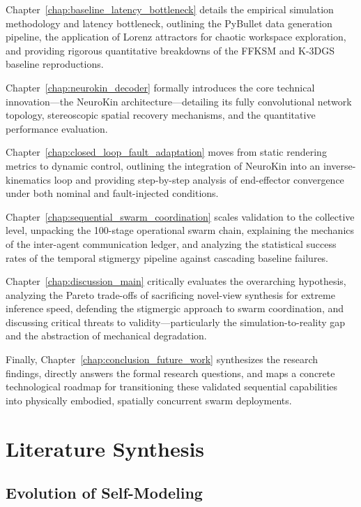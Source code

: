 \documentclass[12pt,a4paper,oneside]{report}
\begin{document}
Chapter~\ref{chap:baseline_latency_bottleneck} details the empirical simulation methodology and latency bottleneck, outlining the PyBullet data generation pipeline, the application of Lorenz attractors for chaotic workspace exploration, and providing rigorous quantitative breakdowns of the FFKSM and K-3DGS baseline reproductions.

Chapter~\ref{chap:neurokin_decoder} formally introduces the core technical innovation---the NeuroKin architecture---detailing its fully convolutional network topology, stereoscopic spatial recovery mechanisms, and the quantitative performance evaluation.

Chapter~\ref{chap:closed_loop_fault_adaptation} moves from static rendering metrics to dynamic control, outlining the integration of NeuroKin into an inverse-kinematics loop and providing step-by-step analysis of end-effector convergence under both nominal and fault-injected conditions.

Chapter~\ref{chap:sequential_swarm_coordination} scales validation to the collective level, unpacking the 100-stage operational swarm chain, explaining the mechanics of the inter-agent communication ledger, and analyzing the statistical success rates of the temporal stigmergy pipeline against cascading baseline failures.

Chapter~\ref{chap:discussion_main} critically evaluates the overarching hypothesis, analyzing the Pareto trade-offs of sacrificing novel-view synthesis for extreme inference speed, defending the stigmergic approach to swarm coordination, and discussing critical threats to validity---particularly the simulation-to-reality gap and the abstraction of mechanical degradation.

Finally, Chapter~\ref{chap:conclusion_future_work} synthesizes the research findings, directly answers the formal research questions, and maps a concrete technological roadmap for transitioning these validated sequential capabilities into physically embodied, spatially concurrent swarm deployments.
\clearpage


\chapter{Literature Synthesis}
\label{chap:literature_synthesis}
\section{Evolution of Self-Modeling}
\end{document}
